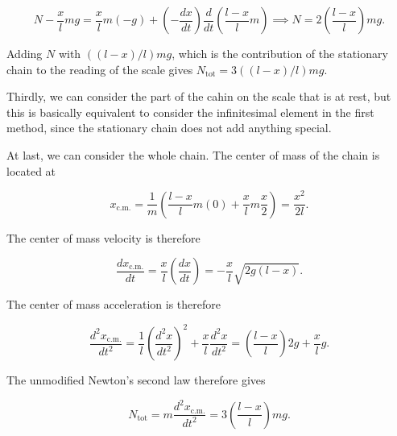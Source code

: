 \documentclass[a4paper,12pt]{report}
\begin{document}
{\begin{equation}
	N - \frac{x}{l}mg = \frac{x}{l}m(-g) + \left(-\frac{dx}{dt} \right) \frac{d}{dt}\left( \frac{l-x}{l} m \right) \implies N = 2\left( \frac{l-x}{l}  \right)  mg.
\end{equation}

Adding \(N\) with \(((l-x) /l) mg\), which is the contribution of the stationary chain to the reading of the scale gives \(N_{\text{tot} } = 3 \left( (l-x) /l \right)mg\).   

Thirdly, we can consider the part of the cahin on the scale that is at rest, but this is basically equivalent to consider the infinitesimal element in the first method, since the stationary chain does not add anything special.

At last, we can consider the whole chain. The center of mass of the chain is located at 

\begin{equation}
	x_{\text{c.m.} }  = \frac{1}{m} \left( \frac{l-x}{l}m(0) + \frac{x}{l}m \frac{x}{2}    \right) = \frac{x^2}{2l}. 
\end{equation}

The center of mass velocity is therefore 

\begin{equation}
	\frac{dx_{\text{c.m.} } }{dt} = \frac{x}{l}\left( \frac{dx}{dt}  \right) = -\frac{x}{l} \sqrt{2g(l-x)}. 
\end{equation}

The center of mass acceleration is therefore

\begin{equation}
	\frac{d^2x_{\text{c.m.} } }{dt^2} = \frac{1}{l}\left( \frac{d^2x}{dt^2}  \right)^2 + \frac{x}{l}\frac{d^2x}{dt^2} = \left( \frac{l-x}{l}  \right)2g + \frac{x}{l}g.   
\end{equation}

The unmodified Newton's second law therefore gives

\begin{equation}
	N_{\text{tot} } =  m \frac{d^2x_{\text{c.m.} } }{dt^2} = 3 \left( \frac{l-x}{l}  \right) mg. 
\end{equation}















} 
\end{document}
